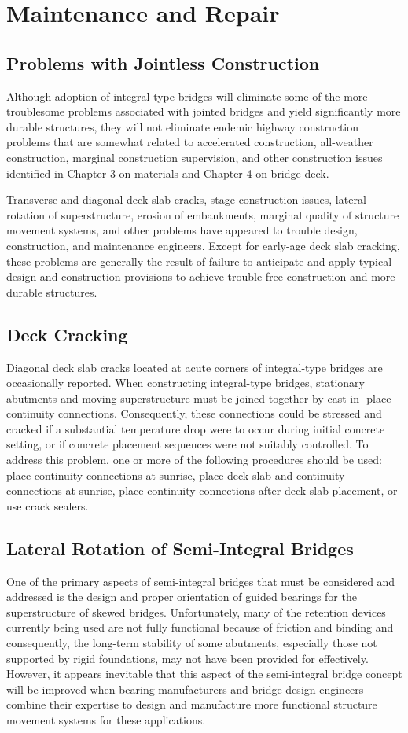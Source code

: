 \section{Maintenance and Repair}
\subsection{Problems with Jointless Construction}
Although adoption of integral-type bridges will eliminate some of the more troublesome problems associated with
jointed bridges and yield significantly more durable structures, they will not eliminate endemic highway construction
problems that are somewhat related to accelerated construction, all-weather construction, marginal construction
supervision, and other construction issues identified in Chapter 3 on materials and Chapter 4 on bridge deck.

Transverse and diagonal deck slab cracks, stage construction issues, lateral rotation of superstructure, erosion of
embankments, marginal quality of structure movement systems, and other problems have appeared to trouble design,
construction, and maintenance engineers. Except for early-age deck slab cracking, these problems are generally the
result of failure to anticipate and apply typical design and construction provisions to achieve trouble-free construction
and more durable structures.

\subsection{Deck Cracking}
Diagonal deck slab cracks located at acute corners of integral-type bridges are occasionally reported. When
constructing integral-type bridges, stationary abutments and moving superstructure must be joined together by cast-in-
place continuity connections. Consequently, these connections could be stressed and cracked if a substantial
temperature drop were to occur during initial concrete setting, or if concrete placement sequences were not suitably
controlled. To address this problem, one or more of the following procedures should be used: place continuity connections at sunrise, place deck slab and continuity connections at sunrise, place continuity connections after deck
slab placement, or use crack sealers.

\subsection{Lateral Rotation of Semi-Integral Bridges}
One of the primary aspects of semi-integral bridges that must be considered and addressed is the design and
proper orientation of guided bearings for the superstructure of skewed bridges. Unfortunately, many of the retention
devices currently being used are not fully functional because of friction and binding and consequently, the long-term
stability of some abutments, especially those not supported by rigid foundations, may not have been provided for
effectively. However, it appears inevitable that this aspect of the semi-integral bridge concept will be improved when
bearing manufacturers and bridge design engineers combine their expertise to design and manufacture more
functional structure movement systems for these applications.

